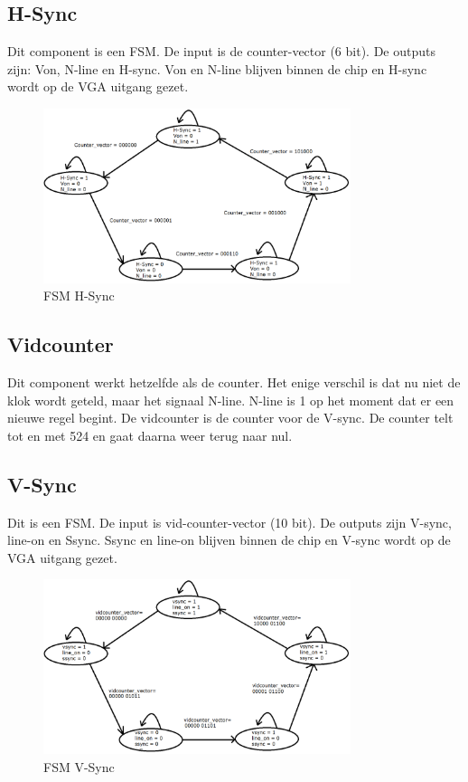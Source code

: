 \documentclass[oneside,dutch]{tudelft-report}
\begin{document}
\subsection{H-Sync}
Dit component is een FSM. De input is de counter-vector (6 bit). De outputs zijn: Von, N-line en H-sync. Von en N-line blijven binnen de chip en H-sync wordt op de VGA uitgang gezet.

\begin{figure}[H]
\center
\includegraphics[width=9cm]{FSM-H-sync}
\caption{FSM H-Sync}
\label{VGA}
\end{figure}

\subsection{Vidcounter}
Dit component werkt hetzelfde als de counter. Het enige verschil is dat nu niet de klok wordt geteld, maar het signaal N-line. N-line is 1 op het moment dat er een nieuwe regel begint. De vidcounter is de counter voor de V-sync. De counter telt tot en met 524 en gaat daarna weer terug naar nul.

\subsection{V-Sync}
Dit is een FSM. De input is vid-counter-vector (10 bit). De outputs zijn V-sync, line-on en Ssync. Ssync en line-on blijven binnen de chip en V-sync wordt op de VGA uitgang gezet.

\begin{figure}[H]
\center
\includegraphics[width=9cm]{FSM-V-sync}
\caption{FSM V-Sync}
\label{VGA}
\end{figure}
\end{document}

